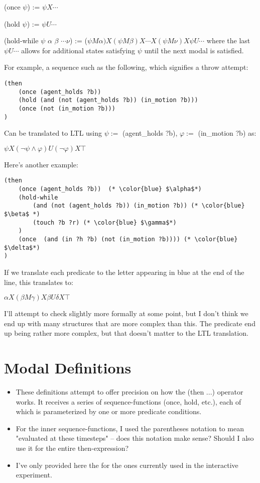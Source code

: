 \documentclass{article}
\begin{document}
(once $\psi$) := $\psi X \cdots$

(hold $\psi$) := $\psi U \cdots$

(hold-while $\psi$ $\alpha$ $\beta$ $\cdots \nu$) := ($\psi M \alpha) X (\psi M \beta) X \cdots X (\psi M \nu) X \psi U \cdots$ where the last $\psi U \cdots$ allows for additional states satisfying $\psi$ until the next modal is satisfied.

For example, a sequence such as the following, which signifies a throw attempt:
\begin{lstlisting}
(then
    (once (agent_holds ?b))
    (hold (and (not (agent_holds ?b)) (in_motion ?b))) 
    (once (not (in_motion ?b)))
)
\end{lstlisting}
Can be translated to LTL using $\psi:=$ (agent_holds ?b), $\varphi:=$ (in_motion ?b) as:

$\psi X (\neg \psi \wedge \varphi) U (\neg \varphi) X \top $

Here's another example: 
\begin{lstlisting}
(then 
    (once (agent_holds ?b))  (* \color{blue} $\alpha$*)
    (hold-while 
        (and (not (agent_holds ?b)) (in_motion ?b)) (* \color{blue} $\beta$ *)
        (touch ?b ?r) (* \color{blue} $\gamma$*)
    ) 
    (once  (and (in ?h ?b) (not (in_motion ?b)))) (* \color{blue} $\delta$*) 
)
\end{lstlisting}
If we translate each predicate to the letter appearing in blue at the end of the line, this translates to:

$\alpha X (\beta M \gamma) X \beta U \delta X \top$

I'll attempt to check slightly more formally at some point, but I don't think we end up with many structures that are more complex than this. 
The predicate end up being rather more complex, but that doesn't matter to the LTL translation.

\section{Modal Definitions}

\begin{itemize}
    \item These definitions attempt to offer precision on how the (then ...) operator works. It receives a series of sequence-functions (once, hold, etc.), each of which is parameterized by one or more predicate conditions. 

    \item For the inner sequence-functions, I used the parentheses notation to mean "evaluated at these timesteps" -- does this notation make sense? Should I also use it for the entire then-expression? 
    
    \item I've only provided here the for the ones currently used in the interactive experiment. 
\end{itemize}
\end{document}
